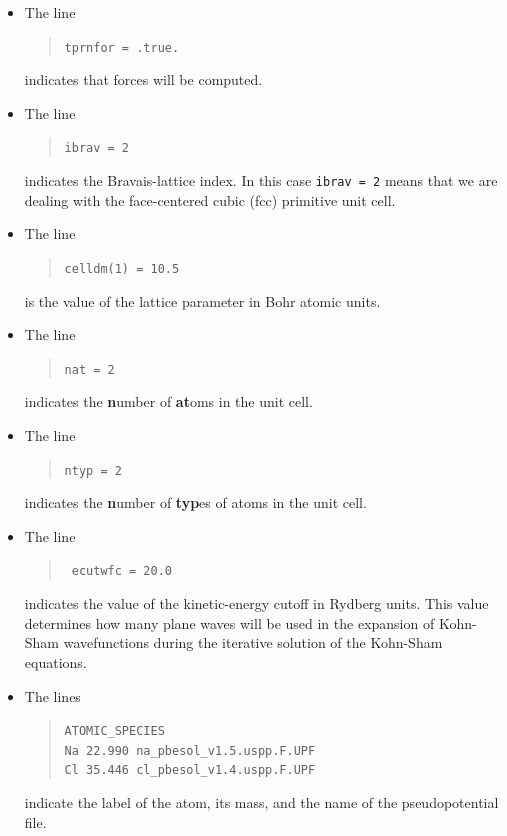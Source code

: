 \documentclass[12pt]{article}
\begin{document}
\begin{itemize}
        \item
          The line
          \begin{quotation}
          {\tt tprnfor = .true.}
          \end{quotation}
          indicates that forces will be computed.

        \item
          The line
          \begin{quotation}
          \noindent
          {\tt ibrav = 2}
          \end{quotation}
          indicates the Bravais-lattice index. In this case {\tt ibrav = 2} means that we are dealing with the face-centered cubic (fcc) primitive unit cell.


        \item
          The line
          \begin{quotation}
          \noindent
          {\tt celldm(1) = 10.5}
          \end{quotation}
          is the value of the lattice parameter in Bohr atomic units.

        \item
          The line
          \begin{quotation}
          \noindent 
          {\tt nat = 2}
          \end{quotation}
          indicates the \textbf{n}umber of \textbf{at}oms in the unit cell.


        \item
          The line
          \begin{quotation}
          \noindent
          {\tt ntyp = 2}
          \end{quotation}
          indicates the \textbf{n}umber of \textbf{typ}es of atoms in the unit cell.  

        \item
          The line
          \begin{quotation}
          \noindent
          {\tt
          ecutwfc = 20.0
          }
          \end{quotation}
          indicates the value of the kinetic-energy cutoff in Rydberg units. This value determines how many plane waves will be used in the expansion of Kohn-Sham wavefunctions during the iterative solution of the Kohn-Sham equations.

        \item
          The lines
          \begin{quotation}
          \noindent
          {\tt ATOMIC\_SPECIES}\\
          {\tt Na  22.990    na\_pbesol\_v1.5.uspp.F.UPF}\\
          {\tt Cl  35.446    cl\_pbesol\_v1.4.uspp.F.UPF}
          \end{quotation}
          indicate the label of the atom, its mass, and the name of the pseudopotential file.



\end{itemize}
\end{document}
